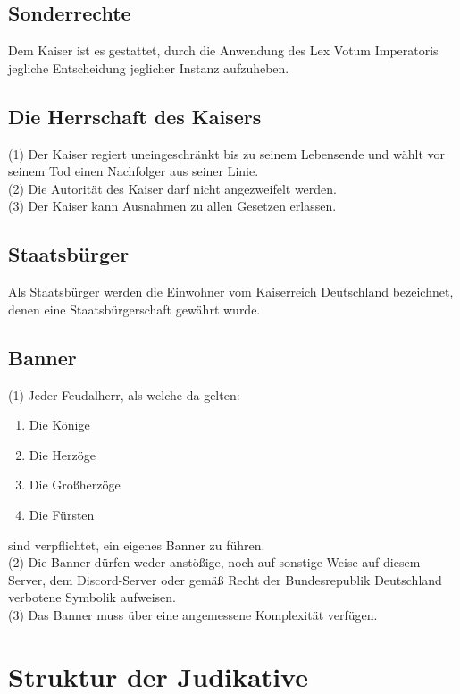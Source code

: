 \documentclass{article}
\begin{document}
\subsection{Sonderrechte}
Dem Kaiser ist es gestattet, durch die Anwendung des Lex Votum Imperatoris jegliche Entscheidung jeglicher Instanz aufzuheben.

\subsection{Die Herrschaft des Kaisers}
(1) Der Kaiser regiert uneingeschränkt bis zu seinem Lebensende und wählt vor seinem Tod einen Nachfolger aus seiner Linie.\\
(2) Die Autorität des Kaiser darf nicht angezweifelt werden.  \\
(3) Der Kaiser kann Ausnahmen zu allen Gesetzen erlassen.  \\

\subsection{Staatsbürger}
Als Staatsbürger werden die Einwohner vom Kaiserreich Deutschland bezeichnet, denen eine Staatsbürgerschaft gewährt wurde.

\subsection{Banner}
(1) Jeder Feudalherr, als welche da gelten:
\begin{enumerate}
	\item Die Könige
	\item Die Herzöge
	\item Die Großherzöge
	\item Die Fürsten
\end{enumerate}
sind verpflichtet, ein eigenes Banner zu führen.\\
(2) Die Banner dürfen weder anstößige, noch auf sonstige Weise auf diesem Server, dem Discord-Server oder gemäß Recht der Bundesrepublik Deutschland verbotene Symbolik aufweisen.\\
(3) Das Banner muss über eine angemessene Komplexität verfügen.

\section{Struktur der Judikative}
\end{document}
